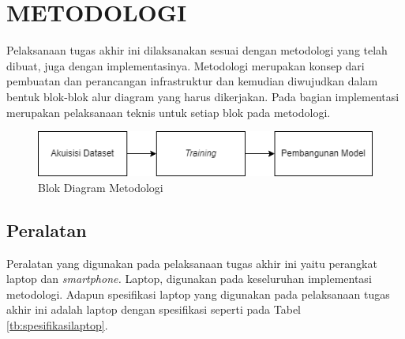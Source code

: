 
\chapter{METODOLOGI}
\label{chap:metodologi}


Pelaksanaan tugas akhir ini dilaksanakan sesuai dengan metodologi yang telah dibuat, juga dengan implementasinya. Metodologi merupakan konsep dari pembuatan dan perancangan infrastruktur dan kemudian diwujudkan dalam bentuk blok-blok alur diagram yang harus dikerjakan. Pada bagian implementasi merupakan pelaksanaan teknis untuk setiap blok pada metodologi.
\begin{figure}[H]
    \centering
    \includegraphics[scale=0.9]{gambar/metodologi_umum.png}
    \caption{Blok Diagram Metodologi}
    \label{fig:desainsistem}
\end{figure}

\section{Peralatan}
\label{sec:peralatan}
Peralatan yang digunakan pada pelaksanaan tugas akhir ini yaitu perangkat laptop dan \textit{smartphone.} Laptop, digunakan pada keseluruhan implementasi metodologi. Adapun spesifikasi laptop yang digunakan pada pelaksanaan tugas akhir ini adalah laptop dengan spesifikasi seperti pada Tabel \ref{tb:spesifikasilaptop}.\par

